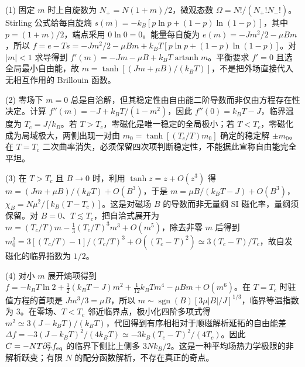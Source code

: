 (1) 固定 \(m\) 时上自旋数为 \(N_+=N(1+m)/2\)，微观态数 \(\Omega=N!/(N_+!N_-!)\)。Stirling 公式给每自旋熵 \(s(m)=-k_B[p\ln p+(1-p)\ln(1-p)]\)，其中 \(p=(1+m)/2\)，端点采用 \(0\ln0=0\)。能量每自旋为 \(e(m)=-Jm^2/2-\mu Bm\)，所以 \(f=e-Ts=-Jm^2/2-\mu Bm+k_BT[p\ln p+(1-p)\ln(1-p)]\)。对 \(|m|<1\) 求导得到 \(f'(m)=-Jm-\mu B+k_BT\operatorname{artanh}m\)。平衡要求 \(f'=0\) 且选全局最小自由能，故 \(m=\tanh[(Jm+\mu B)/(k_BT)]\)，不是把外场直接代入无相互作用的 Brillouin 函数。

(2) 零场下 \(m=0\) 总是自洽解，但其稳定性由自由能二阶导数而非仅由方程存在性决定。计算 \(f''(m)=-J+k_BT/(1-m^2)\)，因此 \(f''(0)=k_BT-J\)，临界温度为 \(T_c=J/k_B\)。若 \(T>T_c\)，零磁化是唯一稳定的全局极小；若 \(T<T_c\)，零磁化成为局域极大，两侧出现一对由 \(m_0=\tanh[(T_c/T)m_0]\) 确定的稳定解 \(\pm m_0\)。在 \(T=T_c\) 二次曲率消失，必须保留四次项判断稳定性，不能据此宣称自由能完全平坦。

(3) 在 \(T>T_c\) 且 \(B\to0\) 时，利用 \(\tanh z=z+O(z^3)\) 得 \(m=(Jm+\mu B)/(k_BT)+O(B^3)\)，于是 \(m=\mu B/(k_BT-J)+O(B^3)\)，\(\chi_B=N\mu^2/[k_B(T-T_c)]\)。这是对磁场 \(B\) 的导数而非无量纲 SI 磁化率，量纲须保留。对 \(B=0\)、\(T\lesssim T_c\)，把自洽式展开为 \(m=(T_c/T)m-\tfrac13(T_c/T)^3m^3+O(m^5)\)，除去非零 \(m\) 后得到 \(m_0^2=3[(T_c/T)-1]/(T_c/T)^3+O((T_c-T)^2)\simeq3(T_c-T)/T_c\)，故自发磁化的临界指数为 \(1/2\)。

(4) 对小 \(m\) 展开熵项得到 \(f=-k_BT\ln2+\tfrac12(k_BT-J)m^2+\tfrac1{12}k_BT m^4-\mu Bm+O(m^6)\)。在 \(T=T_c\) 时驻值方程的首项是 \(Jm^3/3=\mu B\)，所以 \(m\sim\operatorname{sgn}(B)[3\mu|B|/J]^{1/3}\)，临界等温指数为 \(3\)。在零场、\(T<T_c\) 邻近临界点，极小化四阶多项式得 \(m^2\simeq3(J-k_BT)/(k_BT)\)，代回得到有序相相对于顺磁解析延拓的自由能差 \(\Delta f=-3(J-k_BT)^2/(4k_BT)\simeq-3k_B(T_c-T)^2/(4T_c)\)。因此 \(C=-NT\partial_T^2 f_{\rm eq}\) 的临界下侧比上侧多 \(3Nk_B/2\)。这是一种平均场热力学极限的非解析跃变；有限 \(N\) 的配分函数解析，不存在真正的奇点。
